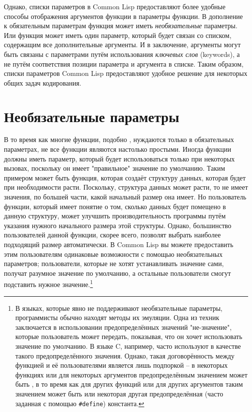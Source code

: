 Однако, списки параметров в Common Lisp предоставляют более удобные способы отображения
аргументов функции в параметры функции.  В дополнение к обязательным параметрам функция
может иметь \textit{необязательные} параметры.  Или функция может иметь один параметр,
который будет связан со списком, содержащим все дополнительные аргументы.  И в заключение,
аргументы могут быть связаны с параметрами путём использования \textit{ключевых слов}
(keywords), а не путём соответствия позиции параметра и аргумента в списке.  Таким
образом, списки параметров Common Lisp предоставляют удобное решение для некоторых общих
задач кодирования.

\section{Необязательные параметры}

В то время как многие функции, подобно , нуждаются только в обязательных
параметрах, не все функции являются настолько простыми.  Иногда функции должны иметь
параметр, который будет использоваться только при некоторых вызовах, поскольку он имеет
"правильное" значение по умолчанию.  Таким примером может быть функция, которая создаёт
структуру данных, которая будет при необходимости расти.  Поскольку, структура данных
может расти, то не имеет значения, по большей части, какой начальный размер она имеет.  Но
пользователь функции, который имеет понятие о том, сколько данных будет помещено в данную
структуру, может улучшить производительность программы путём указания нужного начального
размера этой структуры.  Однако, большинство пользователей данной функции, скорее всего,
позволят выбрать наиболее подходящий размер автоматически.  В Common Lisp вы можете
предоставить этим пользователям одинаковые возможности с помощью необязательных
параметров; пользователи, которые не хотят устанавливать значение сами, получат разумное
значение по умолчанию, а остальные пользователи смогут подставить нужное
значение.\footnote{В языках, которые явно не поддерживают необязательные параметры,
  программисты обычно находят методы их эмуляции.  Одна из техник заключается в
  использовании предопределённых значений "не-значение", которые пользователь может
  передать, показывая, что он хочет использовать значение по умолчанию.  В языке C,
  например, часто используют  в качестве такого предопределённого значения.
  Однако, такая договорённость между функцией и её пользователями является лишь подпоркой
  -- в некоторых функциях или для некоторых аргументов предопределённым значением может
  быть , в то время как для других функций или для других аргументов таким
  значением может быть  или некоторая другая предопределённая (часто заданная с
  помощью \lstinline!#define!) константа.}

